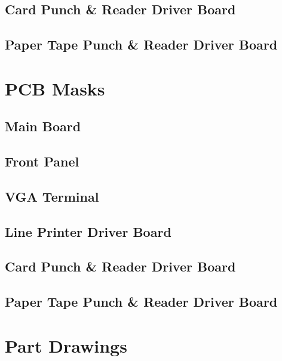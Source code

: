 \documentclass{book}
\begin{document}
\section{Card Punch \& Reader Driver Board}
\clearpage

\section{Paper Tape Punch \& Reader Driver Board}

\chapter{PCB Masks}
\section{Main Board}
\clearpage

\section{Front Panel}
\clearpage

\section{VGA Terminal}
\clearpage

\section{Line Printer Driver Board}
\clearpage

\section{Card Punch \& Reader Driver Board}
\clearpage

\section{Paper Tape Punch \& Reader Driver Board}

\chapter{Part Drawings}

\backmatter


\end{document}
